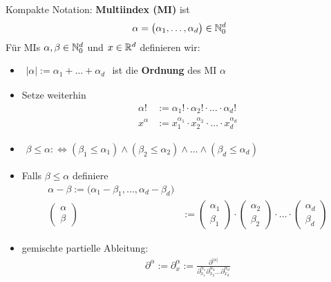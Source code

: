 \begin{notation}
Kompakte Notation: \textbf{Multiindex (MI)} ist
\begin{align*}
\alpha=\big(\alpha_1,\ldots,\alpha_d\big)\in\mathbb{N}_0^d
\end{align*}
Für MIs $\alpha,\beta\in\mathbb{N}_0^d$ und $x\in\mathbb{R}^d$ definieren wir:
\begin{itemize}
\item $\begin{aligned}
|\alpha|:=\alpha_1+\ldots+\alpha_d
\end{aligned}$ ist die \textbf{Ordnung} des MI $\alpha$
\item Setze weiterhin
\begin{align*}
\alpha!&:=\alpha_1!\cdot\alpha_2!\cdot\ldots\cdot\alpha_d!\\
x^\alpha&:=x_1^{\alpha_1}\cdot x_2^{\alpha_2}\cdot\ldots\cdot x_d^{\alpha_d}
\end{align*}
\item $\begin{aligned}
\beta\leq\alpha:\Longleftrightarrow(\beta_1\leq\alpha_1)\wedge(\beta_2\leq\alpha_2)\wedge\ldots\wedge(\beta_d\leq\alpha_d)
\end{aligned}$ 
\item Falls $\beta\leq\alpha$ definiere
\begin{align*}
\alpha-\beta:=\big(\alpha_1-\beta_1,\ldots,\alpha_d-\beta_d\big)\\
\begin{pmatrix}
\alpha\\\beta
\end{pmatrix}&:=\begin{pmatrix}
\alpha_1\\\beta_1
\end{pmatrix}\cdot\begin{pmatrix}
\alpha_2\\\beta_2
\end{pmatrix}\cdot\ldots\cdot\begin{pmatrix}
\alpha_d\\\beta_d
\end{pmatrix}
\end{align*}
\item gemischte partielle Ableitung:
\begin{align*}
\partial^\alpha:=\partial_x^\alpha:=\frac{\partial^{|\alpha|}}{\partial_{x_1}^{\alpha_1}\partial_{x_2}^{\alpha_2}\ldots\partial_{x_d}^{\alpha_d}}
\end{align*}
\end{itemize}
\end{notation}

